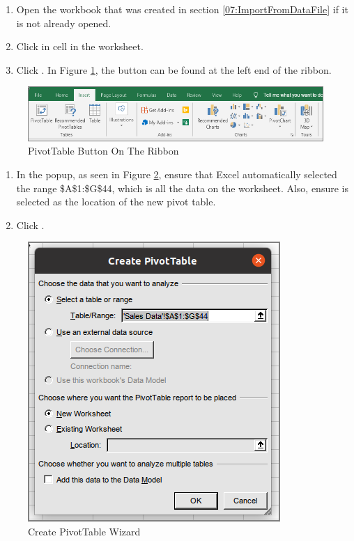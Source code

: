 \begin{enumerate}
	\item Open the  workbook that was created in section \ref{07:ImportFromDataFile} if it is not already opened.
	\item Click in cell  in the  worksheet.
	\item Click . In Figure \ref{07:fig11}, the  button can be found at the left end of the ribbon.
\end{enumerate}

\begin{figure}[H]
	\centering
	\includegraphics[width=\maxwidth{.95\linewidth}]{gfx/ch07_fig11}
	\caption{PivotTable Button On The Ribbon}
	\label{07:fig11}
\end{figure}

\begin{enumerate}
	\item In the  popup, as seen in Figure \ref{07:fig12}, ensure that Excel automatically selected the range \$A\$1:\$G\$44, which is all the data on the worksheet. Also, ensure  is selected as the location of the new pivot table. 
	\item Click .
\end{enumerate}

\begin{figure}[H]
	\centering
	\includegraphics[width=\maxwidth{.95\linewidth}]{gfx/ch07_fig12}
	\caption{Create PivotTable Wizard}
	\label{07:fig12}
\end{figure}


